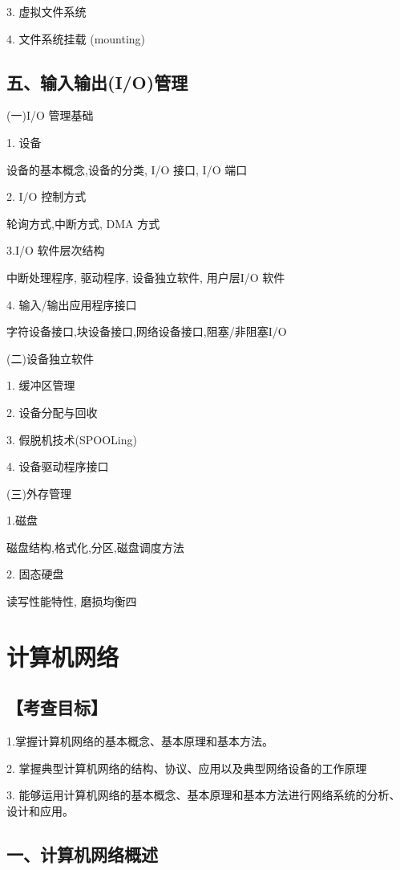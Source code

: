 \documentclass[10pt]{article}
\begin{document}
3. 虚拟文件系统

{\color{red} 4. 文件系统挂载 (mounting)}

\subsection*{五、输入输出(I/O)管理}

{\color{red}
(一)I/O 管理基础

1. 设备

设备的基本概念,设备的分类, I/O 接口, I/O 端口

2. I/O 控制方式

轮询方式,中断方式, DMA 方式

3.I/O 软件层次结构

中断处理程序, 驱动程序, 设备独立软件, 用户层I/O 软件

4. 输入/输出应用程序接口

字符设备接口,块设备接口,网络设备接口,阻塞/非阻塞I/O

(二)设备独立软件

1. 缓冲区管理

2. 设备分配与回收

3. 假脱机技术(SPOOLing)

4. 设备驱动程序接口
}

(三)外存管理

1.磁盘

磁盘结构,格式化,分区,磁盘调度方法

2. 固态硬盘

读写性能特性, 磨损均衡四

\section*{计算机网络 }

\subsection*{【考查目标】} 

1.掌握计算机网络的基本概念、基本原理和基本方法。 

2. 掌握典型计算机网络的结构、协议、应用以及典型网络设备的工作原理 

3. 能够运用计算机网络的基本概念、基本原理和基本方法进行网络系统的分析、设计和应用。

\subsection*{一、计算机网络概述}
\end{document}
